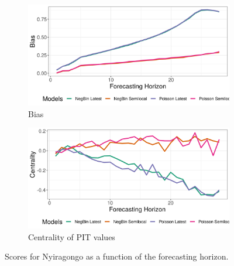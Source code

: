 \begin{figure}[H]
\begin{subfigure}{0.5\textwidth}
  \centering
  \includegraphics[width=\linewidth]{../output/Nyiragongo_bias.png}  
  \caption{Bias}
  \label{fig:Nyiragongo_scores_3}
\end{subfigure}
\begin{subfigure}{0.5\textwidth}
  \centering
  \includegraphics[width=\linewidth]{../output/Nyiragongo_centrality.png}  
  \caption{Centrality of PIT values}
  \label{fig:Nyiragongo_scores_4}
\end{subfigure}
  \caption{Scores for Nyiragongo as a function of the forecasting horizon.}

  \label{fig:nat_scores}
\end{figure}
